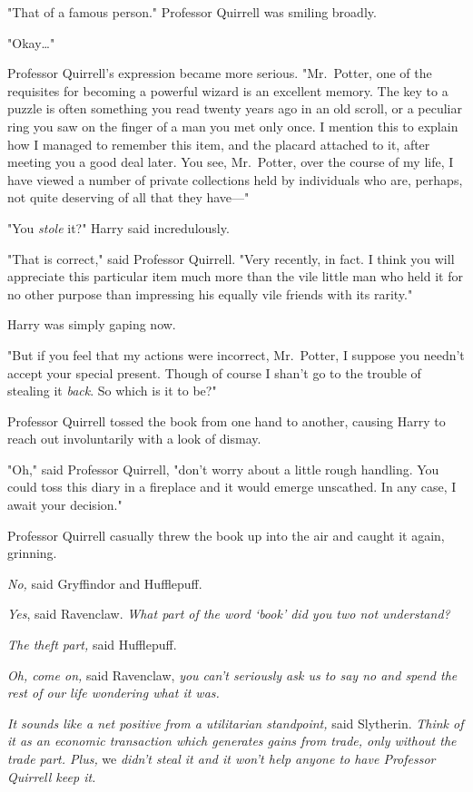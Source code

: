 "That of a famous person." Professor Quirrell was smiling broadly.

"Okay{\ldots}"

Professor Quirrell's expression became more serious. "Mr.~Potter, one of the
requisites for becoming a powerful wizard is an excellent memory. The key to a
puzzle is often something you read twenty years ago in an old scroll, or a
peculiar ring you saw on the finger of a man you met only once. I mention this
to explain how I managed to remember this item, and the placard attached to it,
after meeting you a good deal later. You see, Mr.~Potter, over the course of my
life, I have viewed a number of private collections held by individuals who
are, perhaps, not quite deserving of all that they have---"

"You \emph{stole} it?" Harry said incredulously.

"That is correct," said Professor Quirrell. "Very recently, in fact. I think
you will appreciate this particular item much more than the vile little man who
held it for no other purpose than impressing his equally vile friends with its
rarity."

Harry was simply gaping now.

"But if you feel that my actions were incorrect, Mr.~Potter, I suppose you
needn't accept your special present. Though of course I shan't go to the
trouble of stealing it \emph{back}. So which is it to be?"

Professor Quirrell tossed the book from one hand to another, causing Harry to
reach out involuntarily with a look of dismay.

"Oh," said Professor Quirrell, "don't worry about a little rough handling. You
could toss this diary in a fireplace and it would emerge unscathed. In any
case, I await your decision."

Professor Quirrell casually threw the book up into the air and caught it again,
grinning.

\emph{No,} said Gryffindor and Hufflepuff.

\emph{Yes}, said Ravenclaw. \emph{What part of the word `book' did you two not
understand?}

\emph{The theft part,} said Hufflepuff.

\emph{Oh, come on,} said Ravenclaw, \emph{you can't seriously ask us to say no
and spend the rest of our life wondering what it was.}

\emph{It sounds like a net positive from a utilitarian standpoint,} said
Slytherin. \emph{Think of it as an economic transaction which generates gains
from trade, only without the trade part. Plus,} we \emph{didn't steal it and it
won't help anyone to have Professor Quirrell keep it.}

